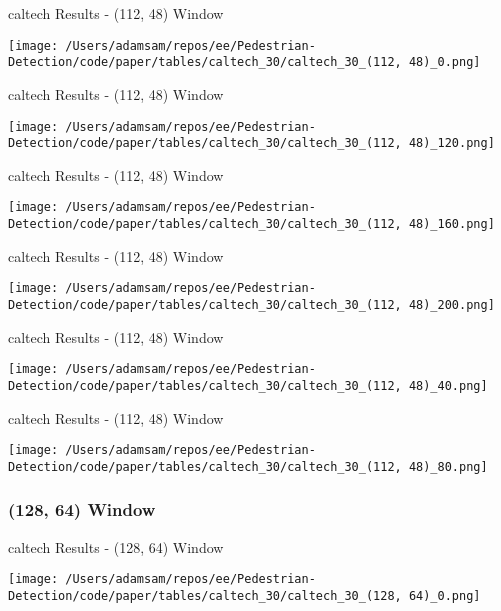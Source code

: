 \begin{table}
    \caption{caltech Results - (112, 48) Window}
    \texttt{[image: /Users/adamsam/repos/ee/Pedestrian-Detection/code/paper/tables/caltech\_30/caltech\_30\_(112, 48)\_0.png]}
    \label{tab:caltech_30_(112, 48)_0}
\end{table}

\begin{table}
    \caption{caltech Results - (112, 48) Window}
    \texttt{[image: /Users/adamsam/repos/ee/Pedestrian-Detection/code/paper/tables/caltech\_30/caltech\_30\_(112, 48)\_120.png]}
    \label{tab:caltech_30_(112, 48)_120}
\end{table}

\begin{table}
    \caption{caltech Results - (112, 48) Window}
    \texttt{[image: /Users/adamsam/repos/ee/Pedestrian-Detection/code/paper/tables/caltech\_30/caltech\_30\_(112, 48)\_160.png]}
    \label{tab:caltech_30_(112, 48)_160}
\end{table}

\begin{table}
    \caption{caltech Results - (112, 48) Window}
    \texttt{[image: /Users/adamsam/repos/ee/Pedestrian-Detection/code/paper/tables/caltech\_30/caltech\_30\_(112, 48)\_200.png]}
    \label{tab:caltech_30_(112, 48)_200}
\end{table}

\begin{table}
    \caption{caltech Results - (112, 48) Window}
    \texttt{[image: /Users/adamsam/repos/ee/Pedestrian-Detection/code/paper/tables/caltech\_30/caltech\_30\_(112, 48)\_40.png]}
    \label{tab:caltech_30_(112, 48)_40}
\end{table}

\begin{table}
    \caption{caltech Results - (112, 48) Window}
    \texttt{[image: /Users/adamsam/repos/ee/Pedestrian-Detection/code/paper/tables/caltech\_30/caltech\_30\_(112, 48)\_80.png]}
    \label{tab:caltech_30_(112, 48)_80}
\end{table}

\subsubsection*{(128, 64) Window}

\begin{table}
    \caption{caltech Results - (128, 64) Window}
    \texttt{[image: /Users/adamsam/repos/ee/Pedestrian-Detection/code/paper/tables/caltech\_30/caltech\_30\_(128, 64)\_0.png]}
    \label{tab:caltech_30_(128, 64)_0}
\end{table}

